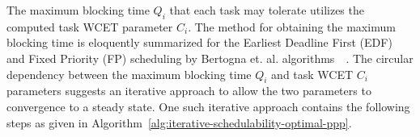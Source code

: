 The maximum blocking time \begin{math}Q_{i}\end{math} that each task may tolerate utilizes the computed task WCET parameter \begin{math}C_{i}\end{math}.  The method for obtaining the maximum blocking time is eloquently summarized for the Earliest Deadline First (EDF) and Fixed Priority (FP) scheduling by Bertogna et. al. algorithms~\cite{bertogna:11}~\cite{bertogna:10}.  The circular dependency between the maximum blocking time \begin{math}Q_{i}\end{math} and task WCET \begin{math}C_{i}\end{math} parameters suggests an iterative approach to allow the two parameters to convergence to a steady state.  One such iterative approach contains the following steps as given in Algorithm~\ref{alg:iterative-schedulability-optimal-ppp}.
%
